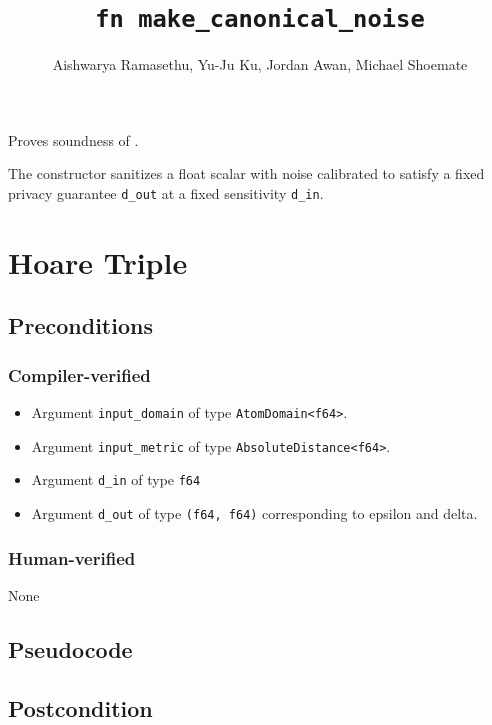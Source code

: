 \documentclass{article}
\title{\texttt{fn make\_canonical\_noise}}
\author{Aishwarya Ramasethu, Yu-Ju Ku, Jordan Awan, Michael Shoemate}
\begin{document}
\maketitle

\contrib

Proves soundness of .

The constructor sanitizes a float scalar with noise calibrated to satisfy 
a fixed privacy guarantee \texttt{d\_out} at a fixed sensitivity \texttt{d\_in}.

\section{Hoare Triple}

\subsection*{Preconditions}
\subsubsection*{Compiler-verified}
\begin{itemize}
    \item Argument \texttt{input\_domain} of type \texttt{AtomDomain<f64>}.
    \item Argument \texttt{input\_metric} of type \texttt{AbsoluteDistance<f64>}.
    \item Argument \texttt{d\_in} of type \texttt{f64}
    \item Argument \texttt{d\_out} of type \texttt{(f64, f64)} corresponding to epsilon and delta.
\end{itemize}

\subsubsection*{Human-verified}
None

\subsection*{Pseudocode}



\subsection*{Postcondition}
\end{document}
